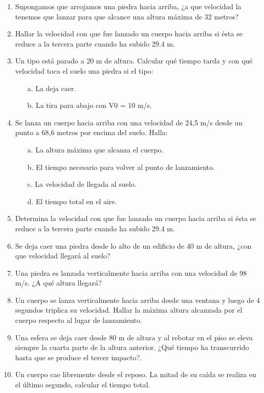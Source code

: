 \begin{enumerate}
 \item Supongamos que arrojamos una piedra hacia arriba, ¿a que velocidad la tenemos que lanzar para que alcance una altura máxima
de 32 metros?
\item Hallar la velocidad con que fue lanzado un cuerpo hacia arriba si ésta se reduce a la tercera parte cuando ha subido 29.4 m.
\item Un tipo está parado a 20 m de altura. Calcular qué tiempo tarda y con qué velocidad toca el suelo una piedra si el tipo:
\begin{itemize}
 \item[a.] La deja caer.
 \item[b.] La tira para abajo con V0 = 10 m/s.
\end{itemize}
\item Se lanza un cuerpo hacia arriba con una velocidad de 24,5 m/s desde un punto a 68,6 metros por encima del suelo. Halla:

\begin{itemize}
 \item[a.] La altura máxima que alcanza el cuerpo.
 \item[b.] El tiempo necesario para volver al punto de lanzamiento.
 \item[c.] La velocidad de llegada al suelo.
 \item[d.] El tiempo total en el aire.
\end{itemize}

\item Determina la velocidad con que fue lanzado un cuerpo hacia arriba si ésta se reduce a la tercera 
parte cuando ha subido 
29.4 m.

\item  Se deja caer una
 piedra desde lo alto de un edificio de 40 m de altura, ¿con que velocidad llegará al suelo?

\item  Una piedra es lanzada verticalmente
 hacia arriba con una velocidad de 98 m/s. ¿A qué altura llegará?

\item Un cuerpo se lanza verticalmente hacia arriba desde una ventana y luego de 4 segundos triplica su velocidad. Hallar la 
máxima altura alcanzada por el cuerpo respecto al lugar de lanzamiento.
\item Una esfera se deja caer desde 80 m de altura y al rebotar en el piso se eleva siempre la cuarta parte de la altura 
anterior. 
¿Qué tiempo ha transcurrido hasta que se produce el tercer impacto?.
\item Un cuerpo cae libremente desde el reposo. La mitad de su caída se realiza en el último segundo, calcular el tiempo total.


\end{enumerate}
